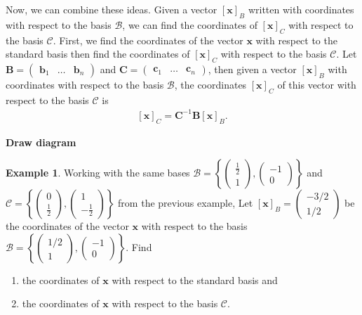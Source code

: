 \documentclass[
]{book}
\providecommand{\tightlist}{%
  \setlength{\itemsep}{0pt}\setlength{\parskip}{0pt}}
\theoremstyle{definition}
\theoremstyle{definition}
\newtheorem{example}{Example}[chapter]
\theoremstyle{definition}
\theoremstyle{definition}
\theoremstyle{remark}
\begin{document}
Now, we can combine these ideas. Given a vector \(\left[\mathbf{x}\right]_B\) written with coordinates with respect to the basis \(\mathcal{B}\), we can find the coordinates of \(\left[\mathbf{x}\right]_C\) with respect to the basis \(\mathcal{C}\). First, we find the coordinates of the vector \(\mathbf{x}\) with respect to the standard basis then find the coordinates of \(\left[\mathbf{x}\right]_C\) with respect to the basis \(\mathcal{C}\). Let \(\mathbf{B} = \begin{pmatrix} \mathbf{b}_1 & \ldots & \mathbf{b}_n \end{pmatrix}\) and \(\mathbf{C} = \begin{pmatrix} \mathbf{c}_1 & \ldots & \mathbf{c}_n \end{pmatrix}\), then given a vector \(\left[\mathbf{x}\right]_B\) with coordinates with respect to the basis \(\mathcal{B}\), the coordinates \(\left[\mathbf{x}\right]_C\) of this vector with respect to the basis \(\mathcal{C}\) is
\[
\begin{aligned}
\left[\mathbf{x}\right]_C = \mathbf{C}^{-1} \mathbf{B} \left[\mathbf{x}\right]_B.
\end{aligned}
\]

\textbf{Draw diagram}

\begin{example}

Working with the same bases \(\mathcal{B} = \left\{ \begin{pmatrix} \frac{1}{2} \\ 1 \end{pmatrix}, \begin{pmatrix} -1 \\ 0 \end{pmatrix}\right\}\) and \(\mathcal{C} = \left\{ \begin{pmatrix} 0 \\ \frac{1}{2} \end{pmatrix}, \begin{pmatrix} 1 \\ -\frac{1}{2} \end{pmatrix}\right\}\) from the previous example, Let \(\left[\mathbf{x}\right]_B = \begin{pmatrix} -3/2 \\ 1/2 \end{pmatrix}\) be the coordinates of the vector \(\mathbf{x}\) with respect to the basis \(\mathcal{B} = \left\{ \begin{pmatrix} 1/2 \\ 1 \end{pmatrix}, \begin{pmatrix} -1 \\ 0 \end{pmatrix}\right\}\). Find

\begin{enumerate}
\def\labelenumi{\arabic{enumi})}
\tightlist
\item
  the coordinates of \(\mathbf{x}\) with respect to the standard basis and
\item
  the coordinates of \(\mathbf{x}\) with respect to the basis \(\mathcal{C}\).
\end{enumerate}

\end{example}
\end{document}
